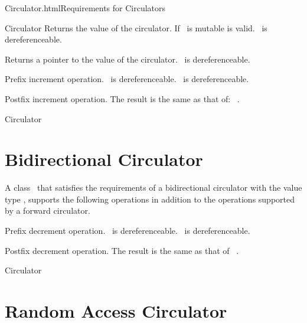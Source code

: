 \begin{ccHtmlClassFile}{Circulator.html}{Requirements for Circulators}
\begin{ccClass}{Circulator}
{Returns the value of the circulator.
 If \ccClassName\ is mutable  is valid.
 \ccPrecond \ccVar\ is dereferenceable.}

{Returns a pointer to the value of the circulator.
 \ccPrecond \ccVar\ is dereferenceable.}

{Prefix increment operation.
\ccPrecond \ccVar\ is dereferenceable. 
\ccPostcond \ccVar\ is dereferenceable.}

{Postfix increment operation. The result is the same as that of: 
 ~.}

\end{ccClass} 


\ccHtmlNoClassLinks
\ccHtmlNoClassIndex
\begin{ccClass}{Circulator}
\section{Bidirectional Circulator}

A class \ccClassName\ that satisfies the requirements of a bidirectional
circulator with the value type , supports the following operations
in addition to the operations supported by a forward circulator.

\ccTypes
{}


\ccPropagateThreeToTwoColumns
{}
\ccOperations

{Prefix decrement operation.
 \ccPrecond \ccVar\ is dereferenceable. \ccPostcond\ccVar\ is dereferenceable.}

{Postfix decrement operation. The result is the same as that of 
 ~.}

\end{ccClass} 


\ccHtmlNoClassLinks
\ccHtmlNoClassIndex
\begin{ccClass}{Circulator}
\section{Random Access Circulator}
\label{sectionRandomAccessCirculatorRequ}


\end{ccClass}
\end{ccHtmlClassFile}

